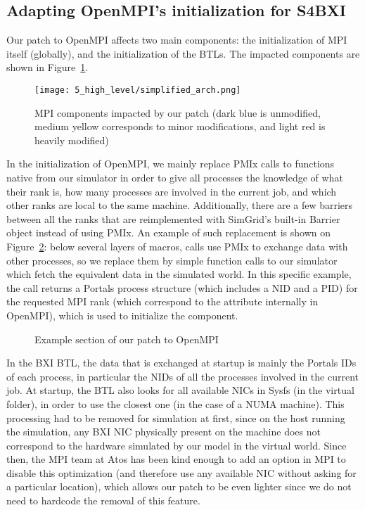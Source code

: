 \subsection{Adapting OpenMPI's initialization for S4BXI}

Our patch to OpenMPI affects two main components: the initialization of MPI
itself (globally), and the initialization of the BTLs. The impacted components
are shown in Figure~\ref{fig:5_high_level:simplified_arch}.

\begin{figure}[!ht]
    \centering
    \texttt{[image: 5\_high\_level/simplified\_arch.png]}
    \caption{MPI components impacted by our patch \small{(dark blue is unmodified, medium yellow corresponds to minor modifications, and light red is heavily modified)}}
    \label{fig:5_high_level:simplified_arch}
\end{figure}

In the initialization of OpenMPI, we mainly replace PMIx calls to functions
native from our simulator in order to give all processes the knowledge of what
their rank is, how many processes are involved in the current job, and which
other ranks are local to the same machine. Additionally, there are a few
barriers between all the ranks that are reimplemented with SimGrid's built-in
Barrier object instead of using PMIx. An example of such replacement is shown on
Figure~\ref{fig:5_high_level:ompi_example_diff}: below several layers of macros,
\mbox{} calls use PMIx to exchange data with other
processes, so we replace them by simple function calls to our simulator which
fetch the equivalent data in the simulated world. In this specific example, the
call returns a Portals process structure (which includes a NID and a PID) for
the requested MPI rank (which correspond to the  attribute
internally in OpenMPI), which is used to initialize the 
component.

\begin{figure}[!ht]
    
    \caption{Example section of our patch to OpenMPI}
    \label{fig:5_high_level:ompi_example_diff}
\end{figure}

In the BXI BTL, the data that is exchanged at startup is mainly the Portals IDs
of each process, in particular the NIDs of all the processes involved in the
current job. At startup, the BTL also looks for all available NICs in Sysfs (in
the  virtual folder), in order to use the closest one (in
the case of a NUMA machine). This processing had to be removed for simulation at
first, since on the host running the simulation, any BXI NIC physically present
on the machine does not correspond to the hardware simulated by our model in the
virtual world. Since then, the MPI team at Atos has been kind enough to add an
option in MPI to disable this optimization (and therefore use any available NIC
without asking for a particular location), which allows our patch to be even
lighter since we do not need to hardcode the removal of this feature.

